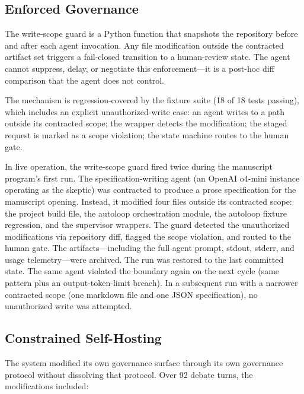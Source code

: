 \documentclass[11pt]{article}
\begin{document}
\subsection{Enforced Governance}

The write-scope guard is a Python function that snapshots the repository before and after each agent invocation. Any file modification outside the contracted artifact set triggers a fail-closed transition to a human-review state. The agent cannot suppress, delay, or negotiate this enforcement---it is a post-hoc diff comparison that the agent does not control.

The mechanism is regression-covered by the fixture suite (18 of 18 tests passing), which includes an explicit unauthorized-write case: an agent writes to a path outside its contracted scope; the wrapper detects the modification; the staged request is marked as a scope violation; the state machine routes to the human gate.

In live operation, the write-scope guard fired twice during the manuscript program's first run. The specification-writing agent (an OpenAI o4-mini instance operating as the skeptic) was contracted to produce a prose specification for the manuscript opening. Instead, it modified four files outside its contracted scope: the project build file, the autoloop orchestration module, the autoloop fixture regression, and the supervisor wrappers. The guard detected the unauthorized modifications via repository diff, flagged the scope violation, and routed to the human gate. The artifacts---including the full agent prompt, stdout, stderr, and usage telemetry---were archived. The run was restored to the last committed state. The same agent violated the boundary again on the next cycle (same pattern plus an output-token-limit breach). In a subsequent run with a narrower contracted scope (one markdown file and one JSON specification), no unauthorized write was attempted.

\subsection{Constrained Self-Hosting}

The system modified its own governance surface through its own governance protocol without dissolving that protocol. Over 92 debate turns, the modifications included:
\end{document}
